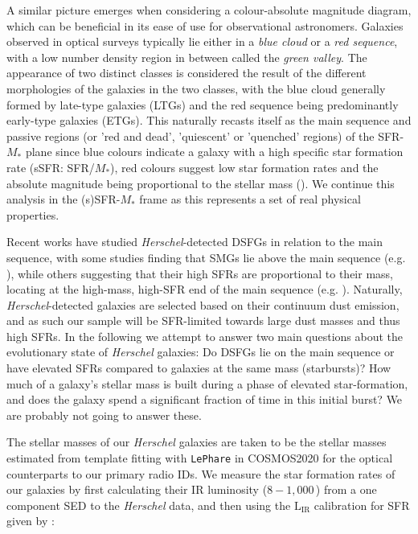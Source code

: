 A similar picture emerges when considering a colour-absolute magnitude diagram, which can be beneficial in its ease of use for observational astronomers. Galaxies observed in  optical surveys typically lie either in a \textit{blue cloud} or a \textit{red sequence}, with a low number density region in between called the \textit{green valley}. The appearance of two distinct classes is considered the result of the different morphologies of the galaxies in the two classes, with the blue cloud generally formed by late-type galaxies (LTGs) and the red sequence being predominantly early-type galaxies (ETGs). This naturally recasts itself as the main sequence and passive regions (or 'red and dead', 'quiescent' or 'quenched' regions) of the SFR-$M_*$ plane since blue colours indicate a galaxy with a high specific star formation rate (sSFR: SFR/$M_*$), red colours suggest low star formation rates and the absolute magnitude being proportional to the stellar mass (\citealt{Eales_2018}). We continue this analysis in the (s)SFR-$M_*$ frame as this represents a set of real physical properties.

Recent works have studied \textit{Herschel}-detected DSFGs in relation to the main sequence, with some studies finding that SMGs lie above the main sequence (e.g. \citealt{Hainline_2011}), while others suggesting that their high SFRs are proportional to their mass, locating at the high-mass, high-SFR end of the main sequence (e.g. \citealt{Michalowski_2012}). Naturally, \textit{Herschel}-detected galaxies are selected based on their continuum dust emission, and as such our sample will be SFR-limited towards large dust masses and thus high SFRs. In the following we attempt to answer two main questions about the evolutionary state of \textit{Herschel} galaxies: Do DSFGs lie on the main sequence or have elevated SFRs compared to galaxies at the same mass (starbursts)? How much of a galaxy's stellar mass is built during a phase of elevated star-formation, and does the galaxy spend a significant fraction of time in this initial burst? {\color{red}We are probably not going to answer these.}

The stellar masses of our \textit{Herschel} galaxies are taken to be the stellar masses estimated from template fitting with \texttt{LePhare} in COSMOS2020 for the optical counterparts to our primary radio IDs. We measure the star formation rates of our galaxies by first calculating their IR luminosity ($8 - 1,000\,$\micron) from a one component SED to the \textit{Herschel} data, and then using the $\textrm{L}_{\textrm{IR}}$ calibration for SFR given by \citealt{Murphy_2011}:


